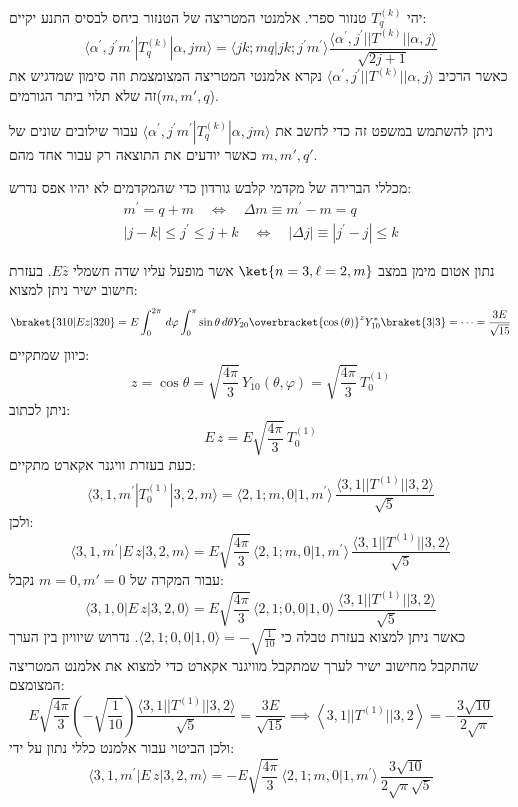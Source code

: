 \documentclass{tstextbook}
\begin{document}
\begin{theorem}
יהי \(T_{q}^{(k)}\) טנזור ספרי. אלמנטי המטריצה של הטנזור ביחס לבסיס התנע יקיים:
$$\langle\alpha^{\prime},j^{\prime}m^{\prime}|T_{q}^{(k)}|\alpha,j m\rangle=\langle j k;m q|j k;j^{\prime}m^{\prime}\rangle\frac{\langle\alpha^{\prime},j^{\prime}||T^{(k)}||\alpha,j\rangle}{\sqrt{2j+1}}$$
כאשר הרכיב \(\langle\alpha^{\prime},j^{\prime}||T^{(k)}||\alpha,j\rangle\) נקרא אלמנטי המטריצה המצומצמת וזה סימון שמדגיש את זה שלא תלוי ביתר הגורמים(\(m,m',q\)).

\end{theorem}
\begin{remark}
ניתן להשתמש במשפט זה כדי לחשב את \(\langle\alpha^{\prime},j^{\prime}m^{\prime}|T_{q}^{(k)}|\alpha,j m\rangle\) עבור שילובים שונים של \(m,m',q'\) כאשר יודעים את התוצאה רק עבור אחד מהם.

\end{remark}
\begin{corollary}
מכללי הברירה של מקדמי קלבש גורדון כדי שהמקדמים לא יהיו אפס נדרש:
\begin{gather*}m^{\prime}=q+m\quad\iff\quad\Delta m\equiv m^{\prime}-m=q\\ |j-k|\leq j^{\prime}\leq j+k\quad\iff\quad|\Delta j|\equiv|j^{\prime}-j|\leq k 
\end{gather*}

\end{corollary}
\begin{example}
נתון אטום מימן במצב \(\ket{n=3,\ell=2,m}\) אשר מופעל עליו שדה חשמלי \(E\hat{z}\). בעזרת חישוב ישיר ניתן למצוא:
$$\braket{ 310 | Ez|320 } =E\int_{0}^{2\pi}  \, d\varphi \int_{0}^{\pi} \sin \theta \, d\theta Y_{20}  \overbracket{ \cos\left( \theta \right) }^{ z }Y_{10}^{*}\braket{ 3 | 3 } =\dots=\frac{3E}{\sqrt{ 15 }}$$
כיוון שמתקיים:
$$z=\cos\theta=\sqrt{\frac{4\pi}{3}}\,Y_{10}(\theta,\varphi)=\sqrt{\frac{4\pi}{3}}\,T_{0}^{(1)}$$
ניתן לכתוב:
$$E\,z=E\sqrt{\frac{4\pi}{3}}\,T_{0}^{(1)}$$
כעת בעזרת וויגנר אקארט מתקיים:
$$\langle3,1,m^{\prime}|T_{0}^{(1)}|3,2,m\rangle=\langle2,1;m,0|1,m^{\prime}\rangle\,\frac{\langle3,1||T^{(1)}||3,2\rangle}{\sqrt{5}}$$
ולכן:
$$\langle3,1,m^{\prime}|E\,z|3,2,m\rangle=E\sqrt{\frac{4\pi}{3}}\,\langle2,1;m,0|1,m^{\prime}\rangle\,\frac{\langle3,1||T^{(1)}||3,2\rangle}{\sqrt{5}}$$
עבור המקרה של \(m=0,m'=0\) נקבל:
$$\langle3,1,0|E\,z|3,2,0\rangle=E\sqrt{\frac{4\pi}{3}}\,\langle2,1;0,0|1,0\rangle\,\frac{\langle3,1||T^{(1)}||3,2\rangle}{\sqrt{5}}$$
כאשר ניתן למצוא בעזרת טבלה כי \(\langle2,1;0,0|1,0\rangle=-\sqrt{\frac{1}{10}}\).  נדרוש שיוויון בין הערך שהתקבל מחישוב ישיר לערך שמתקבל מוויגנר אקארט כדי למצוא את אלמנט המטריצה המצומצם:
$$E{\sqrt{\frac{4\pi}{3}}}\left(-{\sqrt{\frac{1}{10}}}\right){\frac{\langle3,1||T^{(1)}||3,2\rangle}{\sqrt{5}}}={\frac{3E}{\sqrt{15}}}\implies\left\langle {3},{1}||T^{(1)}||{3},{2} \right\rangle=-\frac{{3}\sqrt{10}}{2\sqrt{\pi}}$$
ולכן הביטוי עבור אלמנט כללי נתון על ידי:
$$\langle3,1,m^{\prime}|E\,z|3,2,m\rangle=-E\sqrt{\frac{4\pi}{3}}\,\langle2,1;m,0|1,m^{\prime}\rangle\,\frac{3\sqrt{10}}{2\sqrt{\pi}\sqrt{5}}$$

\end{example}
\end{document}
